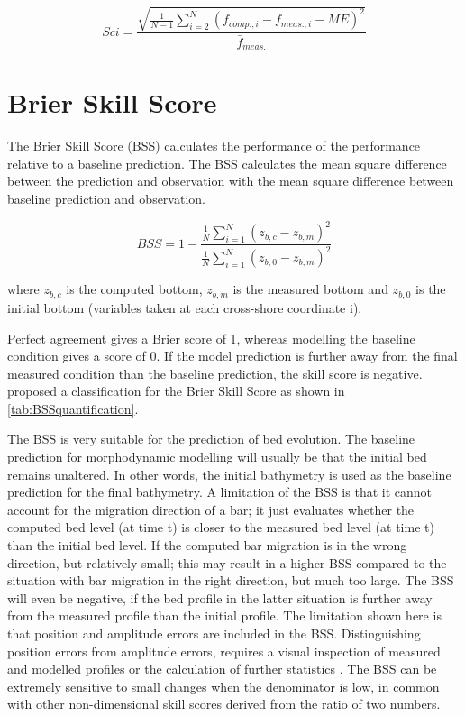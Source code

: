 \begin{equation}Sci=\frac{\sqrt{\frac{1}{N-1}\sum_{i=2}^N(f_{comp.,i}-f_{meas.,i}-ME)^{2}}}{\bar f_{meas.}}\end{equation}

\section{Brier Skill Score}

The Brier Skill Score (BSS) calculates the performance of the performance relative to a baseline prediction. The BSS calculates the mean square difference between the prediction and observation with the mean square difference between baseline prediction and observation. 

\begin{equation}BSS=1-\frac{\frac{1}{N}\sum_{i=1}^N(z_{b,c}-z_{b,m})^{2}}{\frac{1}{N}\sum_{i=1}^N(z_{b,0}-z_{b,m})^{2}}\end{equation}

where $z_{b,c}$ is the computed bottom, $z_{b,m}$ is the measured bottom and $z_{b,0}$ is the initial bottom (variables taken at each cross-shore coordinate i). 

Perfect agreement gives a Brier score of 1, whereas modelling the baseline condition gives a score of 0. If the model prediction is further away from the final measured condition than the baseline prediction, the skill score is negative. \citet{VanRijn2003} proposed a classification for the Brier Skill Score as shown in \autoref{tab:BSSquantification}.

The BSS is very suitable for the prediction of bed evolution. The baseline prediction for morphodynamic modelling will usually be that the initial bed remains unaltered. In other words, the initial bathymetry is used as the baseline prediction for the final bathymetry. A limitation of the BSS is that it cannot account for the migration direction of a bar; it just evaluates whether the computed bed level (at time t) is closer to the measured bed level (at time t) than the initial bed level. If the computed bar migration is in the wrong direction, but relatively small; this may result in a higher BSS compared to the situation with bar migration in the right direction, but much too large. The BSS will even be negative, if the bed profile in the latter situation is further away from the measured profile than the initial profile. The limitation shown here is that position and amplitude errors are included in the BSS. Distinguishing position errors from amplitude errors, requires a visual inspection of measured and modelled profiles or the calculation of further statistics \citep{Murphy1989}. The BSS can be extremely sensitive to small changes when the denominator is low, in common with other non-dimensional skill scores derived from the ratio of two numbers.

